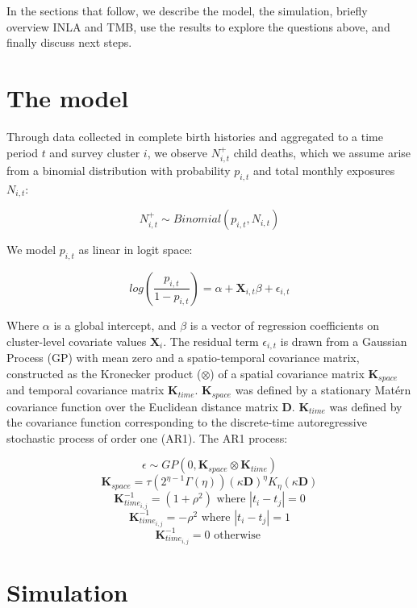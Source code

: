 \documentclass[12pt]{article}
\begin{document}
In the sections that follow, we describe the model, the simulation, briefly overview INLA and TMB, use the results to explore the questions above, and finally discuss next steps. 



\section{The model}


Through data collected in complete birth histories and aggregated to a time period $t$ and survey cluster $i$, we observe $N_{i,t}^+$ child deaths, which we assume arise from a binomial distribution with probability $p_{i,t}$ and total monthly exposures $N_{i,t}$:

$$ N_{i,t}^+ \sim Binomial(p_{i,t},N_{i,t})  $$

We model $p_{i,t}$ as linear in logit space:

$$ log(\frac{p_{i,t}}{1-p_{i,t}}) = \alpha + \boldsymbol{X}_{i,t}\beta + \epsilon_{i,t}  $$


Where $\alpha$ is a global intercept, and $\beta$ is a vector of regression coefficients on cluster-level covariate values $\boldsymbol{X}_i$. The residual term $\epsilon_{i,t}$ is drawn from a Gaussian Process (GP) with mean zero and a spatio-temporal covariance matrix, constructed as the Kronecker product ($\otimes$) of a spatial covariance matrix $\boldsymbol{K}_{space}$ and temporal covariance matrix $\boldsymbol{K}_{time}$. $\boldsymbol{K}_{space}$ was defined by a stationary Matérn covariance function over the Euclidean distance matrix $\boldsymbol{D}$. $\boldsymbol{K}_{time}$ was defined by the covariance function corresponding to the discrete-time autoregressive stochastic process of order one (AR1). The AR1 process:

$$ \epsilon \sim GP(0,\boldsymbol{K}_{space} \otimes \boldsymbol{K}_{time}) $$
$$ \boldsymbol{K}_{space}= \tau(2^{\eta-1} \Gamma(\eta))(\kappa\boldsymbol{D})^\eta K_{\eta}(\kappa\boldsymbol{D}) $$
$$ \boldsymbol{K}_{time_{i,j}}^{-1} = (1+\rho^2) \text{  where }   |t_i-t_j|=0  $$
$$ \boldsymbol{K}_{time_{i,j}}^{-1} = -\rho^2  \text{  where }   |t_i-t_j|=1  $$
$$ \boldsymbol{K}_{time_{i,j}}^{-1} = 0  \text{  otherwise }    $$


\section{Simulation}
\end{document}
